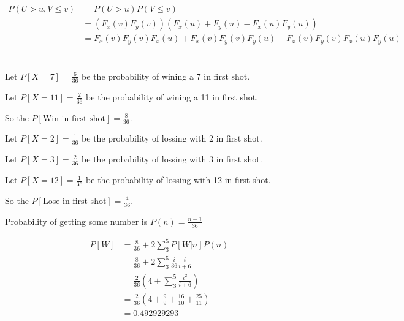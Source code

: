 \documentclass[12pt, a4paper]{article}
\begin{document}
\section{}
\begin{subequations}
  \begin{align}
    P(U > u, V \leq v) &= P(U > u)P(V \leq v)\\
                       &= (F_x(v)F_y(v))(F_x(u)+F_y(u)-F_x(u)F_y(u))\\
                       &= F_x(v)F_y(v)F_x(u)+F_x(v)F_y(v)F_y(u)-F_x(v)F_y(v)F_x(u)F_y(u)
  \end{align}
\end{subequations}

\section{}
Let $P[X=7] = \frac{6}{36}$ be the probability of wining a 7 in first shot.

Let $P[X=11] = \frac{2}{36}$ be the probability of wining a 11 in first shot.

So the $P[\text{Win in first shot}] = \frac{8}{36}$.

Let $P[X=2] = \frac{1}{36}$ be the probability of lossing with 2 in first shot.

Let $P[X=3] = \frac{2}{36}$ be the probability of lossing with 3 in first shot.

Let $P[X=12] = \frac{1}{36}$ be the probability of lossing with 12 in first shot.

So the $P[\text{Lose in first shot}] = \frac{4}{36}$.

Probability of getting some number is $P(n) = \frac{n-1}{36}$

\begin{subequations}
  \begin{align}
    P[W] &= \frac{8}{36} + 2 \sum_3^5 P[W|n]P(n)\\
         &= \frac{8}{36} + 2 \sum_3^5 \frac{i}{36}\frac{i}{i+6}\\
         &= \frac{2}{36} (4+\sum_3^5\frac{i^2}{i+6})\\
         &= \frac{2}{36} (4+\frac{9}{9}+\frac{16}{10}+\frac{25}{11})\\
         &= 0.492929293
  \end{align}
\end{subequations}
\end{document}
